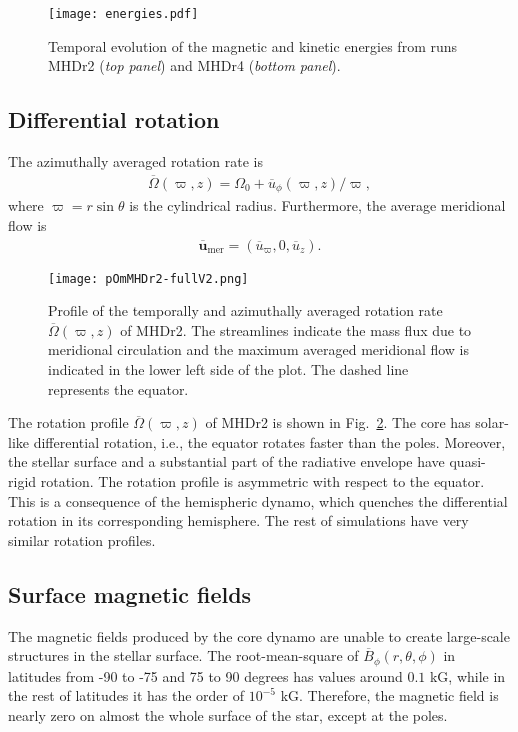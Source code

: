 \documentclass[baaa]{baaa}
\begin{document}
\begin{figure}[t!]
\centering
\texttt{[image: energies.pdf]}
\caption{Temporal evolution of the magnetic and kinetic energies from runs MHDr2 (\emph{top panel}) and MHDr4 (\emph{bottom panel}).}
\label{Figure-2}
\end{figure}



\subsection{Differential rotation}
The azimuthally averaged rotation rate is
\begin{align}
    \overline{\Omega}(\varpi,z) = \Omega_0 + \overline{u}_\phi(\varpi,z)/\varpi,
\end{align}
where $\varpi = r\sin\theta$ is the cylindrical radius. Furthermore, the average meridional flow is 
\begin{align}
    \overline{\bm{u}}_\mathrm{mer} = (\overline{u}_\varpi,0,\overline{u}_z).
\end{align}

\begin{figure}[t!]
\centering
\texttt{[image: pOmMHDr2-fullV2.png]}
\caption{Profile of the temporally and azimuthally averaged rotation rate $\overline{\Omega}(\varpi,z)$ of MHDr2. The streamlines indicate the mass flux due to meridional circulation and the maximum averaged meridional flow is indicated in the lower left side of the plot. The dashed line represents the equator.}
\label{Figure-3}
\end{figure}

The rotation profile $\overline{\Omega}(\varpi,z)$ of MHDr2 is shown in Fig.~\ref{Figure-3}. The core has solar-like differential rotation, i.e., the equator rotates faster than the poles. Moreover, the stellar surface and a substantial part of the radiative envelope have quasi-rigid rotation. The rotation profile is  asymmetric with respect to the equator. This is a consequence of the hemispheric dynamo, which quenches the differential rotation in its corresponding hemisphere. The rest of simulations have very similar rotation profiles.

\subsection{Surface magnetic fields}

The magnetic fields produced by the core dynamo are
unable to create large-scale structures in the stellar surface. The root-mean-square of $\overline{B}_\phi(r,\theta,\phi)$ in latitudes from -90 to -75 and 75 to 90 degrees has values around $0.1$ kG, while in the rest of latitudes it has the order of $10^{-5}$ kG. Therefore, the magnetic field is nearly zero on almost the whole surface of the star, except at the poles.
\end{document}

